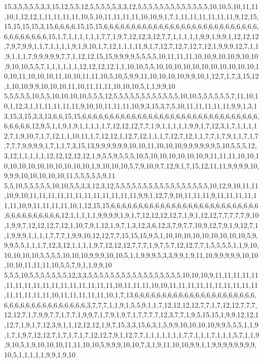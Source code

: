 15,3,5,5,5,5,3,3,15,12,5,5,12,5,5,5,5,5,3,3,12,5,5,5,5,5,5,5,5,5,5,5,5,5,10,10,5,10,11,11,10,1,12,12,1,11,11,11,11,10,5,10,11,11,11,11,10,10,9,1,7,1,11,11,11,11,11,11,9,12,15,15,15,15,15,3,15,6,6,6,6,15,15,15,6,6,6,6,6,6,6,6,6,6,6,6,6,6,6,6,6,6,6,6,6,6,6,6,6,6,6,6,6,6,6,6,6,6,6,6,15,1,7,1,1,1,1,1,1,7,7,1,9,7,12,12,3,12,7,7,1,1,1,1,1,9,9,1,9,9,1,12,12,12,7,9,7,9,9,1,1,7,1,1,1,1,9,1,9,10,1,7,12,1,1,1,11,9,1,7,12,7,12,7,12,7,12,1,9,9,9,12,7,1,1,9,1,1,1,7,9,9,9,9,9,7,7,1,12,12,15,15,9,9,9,9,5,5,5,5,10,11,11,11,10,10,9,10,10,9,10,10,9,10,10,5,5,7,1,1,1,1,1,1,12,12,12,12,1,1,10,10,5,5,10,10,10,10,10,10,10,10,10,10,10,10,10,11,10,10,10,11,10,10,11,11,10,5,10,5,9,9,11,10,10,10,10,9,9,10,1,12,7,1,7,3,15,12,1,10,10,9,9,10,10,10,11,10,11,11,11,10,10,10,5,1,1,9,9,10
5,5,5,5,5,10,5,5,10,10,10,10,5,5,5,12,5,5,5,5,5,5,5,5,5,5,5,5,10,10,5,5,5,5,5,5,7,11,10,10,1,12,3,1,11,11,11,11,11,9,10,10,11,11,11,10,9,3,15,3,7,5,10,11,11,11,11,11,9,9,1,3,13,15,3,15,3,3,13,6,6,15,15,6,6,6,6,6,6,6,6,6,6,6,6,6,6,6,6,6,6,6,6,6,6,6,6,6,6,6,6,6,6,6,6,6,6,6,6,6,12,9,5,1,1,9,1,9,1,1,1,1,1,7,12,12,12,7,7,1,9,1,1,1,1,1,9,9,1,7,12,3,1,7,1,1,1,12,7,1,9,10,7,1,7,12,1,1,10,11,1,7,12,12,1,12,7,12,1,1,1,7,12,7,12,1,1,7,7,1,7,9,1,1,7,1,7,7,7,7,9,9,9,9,1,7,1,1,7,3,15,13,9,9,9,9,9,9,10,10,11,10,10,10,9,9,9,9,9,9,5,10,5,5,5,12,3,12,1,1,1,1,1,12,12,12,12,12,1,9,5,5,9,5,5,5,10,5,10,10,10,10,10,10,9,11,11,11,10,10,10,10,10,10,10,10,10,10,10,10,1,9,10,10,10,5,7,9,10,9,7,12,9,1,7,15,12,11,11,9,9,9,9,10,9,9,9,10,10,10,10,10,11,5,5,5,5,5,9,11
5,5,10,5,5,5,5,5,10,10,5,5,3,3,12,3,12,5,5,5,5,5,5,5,5,5,5,5,5,5,5,5,5,5,10,12,9,10,11,11,10,9,10,11,11,11,11,11,11,11,11,11,11,11,11,9,9,1,12,7,9,10,11,11,11,9,11,11,11,11,11,11,10,9,11,11,11,11,10,1,12,15,15,6,6,6,6,6,6,6,6,6,6,6,6,6,6,6,6,6,6,6,6,6,6,6,6,6,6,6,6,6,6,6,6,6,6,6,6,6,12,1,1,1,1,1,9,9,9,9,1,9,1,7,12,12,12,12,7,1,9,1,12,12,7,7,7,7,7,9,10,1,9,9,7,12,12,12,7,12,1,10,7,9,1,12,1,9,7,1,3,12,3,6,12,3,7,9,7,7,10,9,12,7,9,1,9,12,7,1,1,9,9,9,1,1,1,1,7,7,7,1,9,9,10,12,12,7,7,15,15,15,9,5,1,10,10,10,10,10,10,10,10,10,5,9,9,9,5,5,1,1,1,7,12,3,12,1,1,1,1,9,7,12,12,12,7,7,7,1,9,7,5,7,12,12,7,7,1,5,5,5,5,1,1,9,10,10,10,10,10,5,5,5,5,10,10,10,9,9,9,10,10,5,1,1,9,9,9,5,3,3,9,9,1,9,11,10,9,9,9,9,9,10,10,10,10,11,11,11,10,5,5,7,9,1,1,9,9,10
5,5,5,10,5,5,5,5,5,5,5,12,3,3,5,5,5,5,5,5,5,5,5,5,5,5,5,5,5,5,5,10,10,10,9,11,11,11,11,11,11,11,11,11,11,11,11,11,11,11,11,11,10,11,11,11,10,10,11,11,11,11,11,11,11,11,11,11,11,11,11,11,11,10,11,11,11,11,11,10,1,7,13,6,6,6,6,6,6,6,6,6,6,6,6,6,6,6,6,6,6,6,6,6,6,6,6,6,6,6,6,6,6,6,6,6,6,6,6,6,3,7,7,7,1,1,9,1,5,5,9,1,1,7,12,12,12,12,7,7,1,7,12,12,7,7,7,12,12,7,1,7,9,9,7,7,1,7,7,1,9,9,7,1,7,9,1,9,7,1,7,7,7,7,12,3,7,7,1,9,5,15,15,1,9,9,12,12,1,12,7,1,9,1,7,12,3,9,1,1,12,12,12,1,9,7,15,3,3,15,6,3,1,5,9,9,10,10,10,10,9,9,5,5,5,1,1,9,1,7,1,9,7,12,12,7,1,7,1,7,1,7,12,12,7,9,1,12,7,7,1,1,1,1,1,1,1,7,7,1,1,1,7,1,1,1,5,7,1,1,9,9,10,5,1,9,10,10,10,11,11,10,10,5,9,9,9,10,10,7,3,1,9,11,10,10,9,9,1,1,9,9,9,9,9,9,9,9,10,5,1,1,1,1,1,9,9,1,9,10
